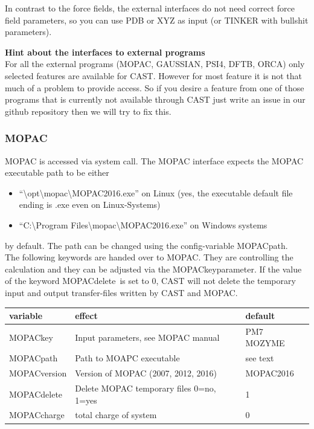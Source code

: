 \documentclass[10pt,a4paper]{article} %
\begin{document}
	In contrast to the force fields, the external interfaces do not need correct force field parameters, so you can use PDB or XYZ as input (or TINKER with bullshit parameters).
	
	\textbf{Hint about the interfaces to external programs}\\
	For all the external programs (MOPAC, GAUSSIAN, PSI4, DFTB, ORCA) only selected features are available for CAST. However for most feature it is not that much of a problem to provide access. So if you desire a feature from one of those programs that is currently not available through CAST just write an issue in our github repository then we will try to fix this.

		\subsubsection{MOPAC}
		\ac{MOPAC} is accessed via system call. The \ac{MOPAC} interface expects the \ac{MOPAC} executable path to be either
		\begin{itemize}
			\item ``\textbackslash opt\textbackslash mopac\textbackslash MOPAC2016.exe'' on Linux (yes, the executable default file ending is .exe even on Linux-Systems)
			\item ``C:\textbackslash Program Files\textbackslash mopac\textbackslash MOPAC2016.exe'' on Windows systems
		\end{itemize} by default. The path can be changed using the config-variable \glqq MOPACpath\grqq.~\\
		The following keywords are handed over to \ac{MOPAC}. They are controlling the calculation and they can be adjusted via the \glqq MOPACkey\grqq parameter.
		If the value of the keyword \glqq MOPACdelete\grqq \ is set to 0, \ac{CAST} will not delete the temporary input and output transfer-files written by \ac{CAST} and \ac{MOPAC}.

		\begin{longtable}{|p{3cm}|p{5cm}|p{3cm}|}
			variable & effect & default \\
			\hline
			MOPACkey & Input parameters, see MOPAC manual & PM7 MOZYME\\
			MOPACpath & Path to MOAPC executable & see text\\
			MOPACversion & Version of MOPAC (2007, 2012, 2016) & MOPAC2016\\
			MOPACdelete & Delete MOPAC temporary files 0=no, 1=yes & 1\\
			MOPACcharge & total charge of system & 0\\
		\end{longtable}
		
\end{document}
